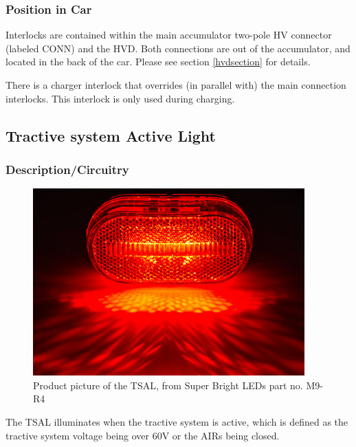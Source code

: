 \documentclass{article}
\begin{document}

        \subsubsection{Position in Car}

            Interlocks are contained within the main accumulator two-pole HV connector (labeled CONN) and the HVD. Both connections are out of the accumulator, and located in the back of the car. Please see section \ref{hvdsection} for details.

            There is a charger interlock that overrides (in parallel with) the main connection interlocks. This interlock is only used during charging.

    \subsection{Tractive system Active Light}

        \subsubsection{Description/Circuitry}

            \begin{figure}[H]
                \centering
                \includegraphics[width = 0.5 \textwidth]{TSALshining}
                \caption{Product picture of the TSAL, from Super Bright LEDs part no. M9-R4}
                \label{tsalsuperbright}
            \end{figure}

            The TSAL illuminates when the tractive system is active, which is defined as the tractive system voltage being over 60V or the AIRs being closed.
\end{document}
